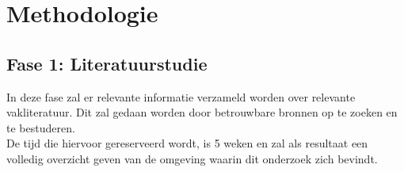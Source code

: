 
\chapter{Methodologie}%
\label{ch:methodologie}


\section{Fase 1: Literatuurstudie}
\label{sec:m-literatuurstudie}
In deze fase zal er relevante informatie verzameld worden over relevante vakliteratuur. Dit zal gedaan worden door betrouwbare bronnen op te zoeken en te bestuderen. \\
De tijd die hiervoor gereserveerd wordt, is 5 weken en zal als resultaat een volledig overzicht geven van de omgeving waarin dit onderzoek zich bevindt. 



